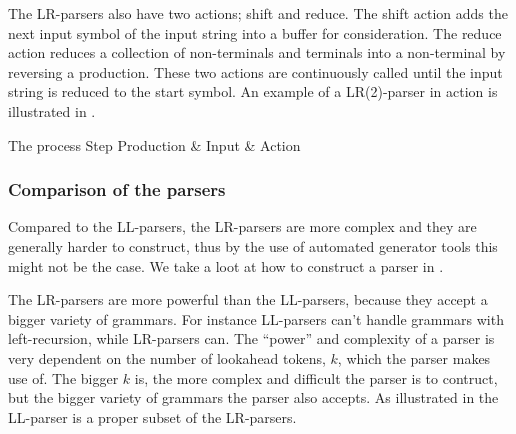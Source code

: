 The LR-parsers
also have two actions; shift and reduce. The shift action adds the next input
symbol of the input string into a buffer for consideration. The reduce action
reduces a collection of non-terminals and terminals into a non-terminal by
reversing a production. These two actions are continuously called until the
input string is reduced to the start symbol.
\cite{LL(1)andLR(2)inaction} 
An example of a LR(2)-parser in action is illustrated in .

	  {The process	    					 }
{Step  	 }{Production & Input       & Action                     }{
}

\subsubsection{Comparison of the parsers}
Compared to the LL-parsers, the LR-parsers are more complex and they are
generally harder to construct,\cite[p. 193]{sebesta2013} thus by the use of
automated generator tools this might not be the case. We take a loot at how to 
construct a parser in . 

The LR-parsers are more powerful than the LL-parsers, because they accept a
bigger variety of grammars. For instance LL-parsers can't handle grammars with
left-recursion, while LR-parsers can. The ``power'' and complexity of a parser
is very dependent on the number of lookahead tokens, $k$, which the parser makes
use of. The bigger $k$ is, the more complex and difficult the parser is to
contruct, but the bigger variety of grammars the parser also accepts. As
illustrated in  the LL-parser is a proper
subset of the LR-parsers.

